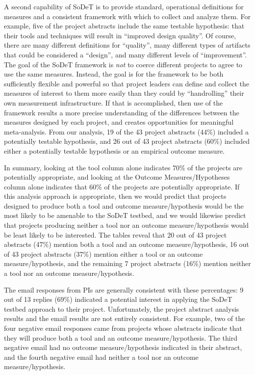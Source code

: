 A second capability of SoDeT is to provide standard, operational
definitions for measures and a consistent framework with which to collect
and analyze them.  For example, five of the project abstracts include the
same testable hypothesis: that their tools and techniques will result in
``improved design quality''.  Of course, there are many different
definitions for ``quality'', many different types of artifacts that could
be considered a ``design'', and many different levels of ``improvement''.
The goal of the SoDeT framework is {\em not} to coerce different projects
to agree to use the same measures.  Instead, the goal is for the framework
to be both sufficiently flexible and powerful so that project leaders can
define and collect the measures of interest to them more easily than they
could by ``handrolling'' their own measurement infrastructure.  If that is
accomplished, then use of the framework results a more precise
understanding of the differences between the measures designed by each
project, and creates opportunities for meaningful meta-analysis.  From our
analysis, 19 of the 43 project abstracts (44\%) included a potentially
testable hypothesis, and 26 out of 43 project abstracts (60\%) included
either a potentially testable hypothesis or an empirical outcome measure.

In summary, looking at the tool column alone indicates 70\% of the projects
are potentially appropriate, and looking at the Outcome Measures/Hypotheses
column alone indicates that 60\% of the projects are potentially
appropriate.  If this analysis approach is appropriate, then we would
predict that projects designed to produce both a tool and outcome
measure/hypothesis would be the most likely to be amenable to the SoDeT
testbed, and we would likewise predict that projects producing neither a
tool nor an outcome measure/hypothesis would be least likely to be
interested.  The tables reveal that 20 out of 43 project abstracts (47\%)
mention both a tool and an outcome measure/hypothesis, 16 out of 43 project
abstracts (37\%) mention either a tool or an outcome measure/hypothesis,
and the remaining 7 project abstracts (16\%) mention neither a tool nor an
outcome measure/hypothesis.

The email responses from PIs are generally consistent with these
percentages: 9 out of 13 replies (69\%) indicated a potential interest in
applying the SoDeT testbed approach to their project.  Unfortunately, the
project abstract analysis results and the email results are not entirely
consistent.  For example, two of the four negative email responses came
from projects whose abstracts indicate that they will produce both a tool
and an outcome measure/hypothesis.  The third negative email had no outcome
measure/hypothesis indicated in their abstract, and the fourth negative
email had neither a tool nor an outcome measure/hypothesis.

